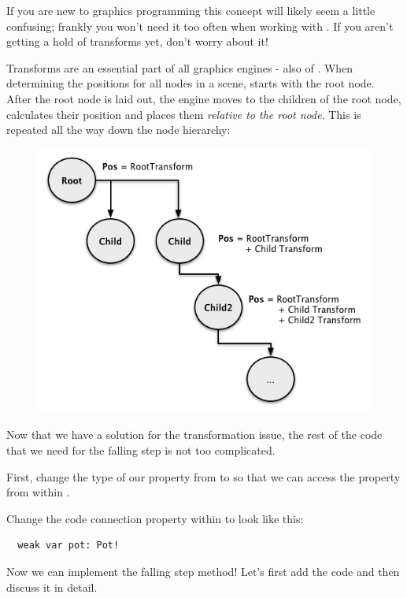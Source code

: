 If you are new to graphics programming this concept will likely seem a little
confusing; frankly you won't need it too often when working with \cocos{}. If
you aren't getting a hold of transforms yet, don't worry about it!

\begin{details}
Transforms are an essential part of all graphics engines - also of \cocos{}.
When determining the positions for all nodes in a scene, \cocos{} starts with
the root node. After the root node is laid out, the engine moves to the children
of the root node, calculates their position and places them \textit{relative to
the root node}. This is repeated all the way down the node hierarchy:
\begin{figure}[H]
		\centering
		\includegraphics[width=0.5\linewidth]{images/Chapter3/parent_transform_rendering.png}
\end{figure}
\end{details}

Now that we have a solution for the transformation issue, the rest of the
code that we need for the falling step is not too complicated.

First, change the type of our  property from \ccsprite to
 so that we can access the 
property from within .

\begin{leftbar}
Change the code connection property  within
 to look like this:
\begin{lstlisting}
  weak var pot: Pot!
\end{lstlisting}
\end{leftbar}

Now we can implement the falling step method! Let's first add the code and then
discuss it in detail.

